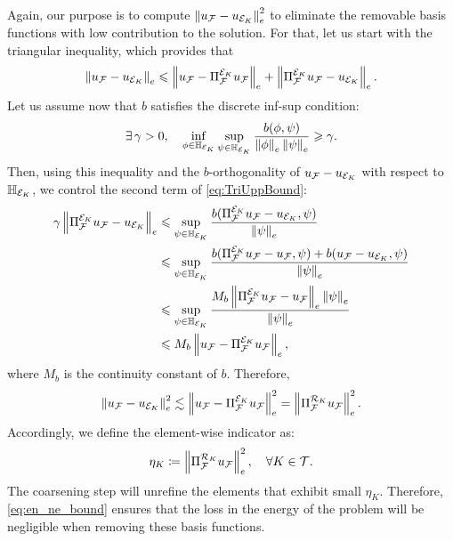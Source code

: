 {{{{{Again, our purpose is to compute $\left\|u_{\mathcal{F}} - u_{\mathcal{E}_K}\right\|_e^2$ to eliminate the removable basis functions with low contribution to the solution. For that, let us start with the triangular inequality, which provides that
\begin{equation}
  \left\|u_{\mathcal{F}}-u_{\mathcal{E}_K}\right\|_e \leqslant \left\|u_{\mathcal{F}}-\Pi_{\mathcal{F}}^{\mathcal{E}_K}u_{\mathcal{F}}\right\|_e+\left\|\Pi_{\mathcal{F}}^{\mathcal{E}_K}u_{\mathcal{F}}-u_{\mathcal{E}_K}\right\|_e.
  \label{eq:TriUppBound}
\end{equation}
Let us assume now that $b$ satisfies the discrete inf-sup condition:
\begin{equation}
  \exists \, \gamma >0, \quad \inf_{\phi \in \mathbb{H}_{\mathcal{E}_K}}\sup_{\psi \in \mathbb{H}_{\mathcal{E}_K}}\frac{b(\phi, \psi)}{\left\|\phi\right\|_{e}\left\|\psi\right\|_{e}} \geqslant \gamma.
  \label{eq:infsup}
\end{equation}
Then, using this inequality and the $b$-orthogonality of $u_{\mathcal{F}}-u_{\mathcal{E}_K}$ with respect to $\mathbb{H}_{\mathcal{E}_K}$, we control the second term of \cref{eq:TriUppBound}:
\begin{align}
  \gamma\left\|\Pi_{\mathcal{F}}^{\mathcal{E}_K}u_{\mathcal{F}}-u_{\mathcal{E}_K}\right\|_e & \leqslant \sup_{\psi \in \mathbb{H}_{\mathcal{E}_K}}\frac{b(\Pi_{\mathcal{F}}^{\mathcal{E}_K}u_{\mathcal{F}}-u_{\mathcal{E}_K}, \psi)}{\left\|\psi\right\|_{e}}                            \\
                                                          & \leqslant \sup_{\psi \in \mathbb{H}_{\mathcal{E}_K}}\frac{b(\Pi_{\mathcal{F}}^{\mathcal{E}_K}u_{\mathcal{F}}-u_{\mathcal{F}}, \psi)+b(u_{\mathcal{F}}-u_{\mathcal{E}_K}, \psi)}{\left\|\psi\right\|_{e}} \\
                                                          & \leqslant \sup_{\psi \in \mathbb{H}_{\mathcal{E}_K}}\frac{M_b\left\|\Pi_{\mathcal{F}}^{\mathcal{E}_K}u_{\mathcal{F}}-u_{\mathcal{F}}\right\|_e\left\|\psi\right\|_e}{\left\|\psi\right\|_{e}}              \\
                                                          & \leqslant M_b \left\|u_{\mathcal{F}}-\Pi_{\mathcal{F}}^{\mathcal{E}_K}u_{\mathcal{F}}\right\|_e,
\end{align}
where $M_b$ is the continuity constant of $b$. Therefore,
\begin{equation}
  \left\|u_{\mathcal{F}}-u_{\mathcal{E}_K}\right\|_e^2 \lesssim \left\|u_{\mathcal{F}}-\Pi_{\mathcal{F}}^{\mathcal{E}_K}u_{\mathcal{F}}\right\|_e^2=\left\|\Pi_{\mathcal{F}}^{\mathcal{R}_K}u_{\mathcal{F}}\right\|_e^2.
  \label{eq:en_ne_bound}
\end{equation}
%
Accordingly, we define the element-wise indicator as:
\begin{equation}
  \eta_K\coloneqq \left\|\Pi_{\mathcal{F}}^{\mathcal{R}_K} u_{\mathcal{F}}\right\|_{e}^2, \quad \forall K \in \mathcal{T}.\label{eq:ENindicators}
\end{equation}
%
The coarsening step will unrefine the elements that exhibit small $\eta_K$. Therefore, \cref{eq:en_ne_bound} ensures that the loss in the energy of the problem will be negligible when removing these basis functions.

}}}}}
